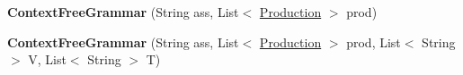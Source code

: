 \begin{DoxyCompactItemize}
\item 
\hypertarget{classcontext_free_1_1grammar_1_1_context_free_grammar_ad4871f790005d3582e0f4d50aceac810}{{\bfseries Context\-Free\-Grammar} (String ass, List$<$ \hyperlink{classcontext_free_1_1grammar_1_1_production}{Production} $>$ prod)}\label{classcontext_free_1_1grammar_1_1_context_free_grammar_ad4871f790005d3582e0f4d50aceac810}

\item 
\hypertarget{classcontext_free_1_1grammar_1_1_context_free_grammar_aa29c85cc857ff390f50efc82d7c959e9}{{\bfseries Context\-Free\-Grammar} (String ass, List$<$ \hyperlink{classcontext_free_1_1grammar_1_1_production}{Production} $>$ prod, List$<$ String $>$ V, List$<$ String $>$ T)}\label{classcontext_free_1_1grammar_1_1_context_free_grammar_aa29c85cc857ff390f50efc82d7c959e9}


\end{DoxyCompactItemize}
